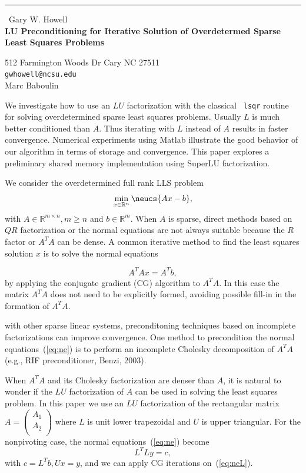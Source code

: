 \documentclass{report}
\begin{document}
\begin{center}
\rule{6in}{1pt} \
{\large Gary W. Howell \\
{\bf LU Preconditioning for Iterative Solution of Overdetermed Sparse Least Squares Problems }}

512 Farmington Woods Dr Cary NC 27511
\\
{\tt gwhowell@ncsu.edu}\\
Marc Baboulin \end{center}

We investigate how to use an $LU$ factorization with the classical {\tt
lsqr} routine for solving overdetermined sparse least squares problems.
Usually $L$ is much better conditioned than $A$. Thus iterating with $L$
instead of $A$ results in faster convergence.
Numerical experiments using Matlab illustrate the good behavior of our
algorithm in terms of storage and convergence.
This paper explores a preliminary shared memory implementation using
SuperLU factorization.


We consider the overdetermined full rank LLS problem
\begin{equation}
\label{eq:llsp}
\min_{x \in \mathbb{R}^n} \neucs{Ax - b},
\end{equation}
with $A \in \mathbb{R}^{m \times n}, m \geq n$ and $b \in \mathbb{R}^m$.
When $A$ is sparse, direct methods based on $QR$ factorization or the
normal equations are not always suitable because the $R$ factor or $A^TA$
can be dense.
A common iterative method to find the least squares solution $x$
is to solve the normal equations

\begin{equation}
\label{eq:ne}
A^TAx = A^Tb,
\end{equation}
by applying the conjugate gradient (CG) algorithm to $A^TA$. In this case the matrix
$A^T A$ does not need to be explicitly formed, avoiding possible fill-in
in the formation of $A^TA$.

with other sparse linear systems, preconditoning techniques based on
incomplete factorizations can improve convergence. One method to
precondition the normal equations~(\ref{eq:ne}) is to perform an
incomplete Cholesky decomposition of $A^T A$ (e.g., RIF preconditioner,
Benzi, 2003).

When $A^TA$ and its Cholesky factorization are denser than $A$, it is
natural to wonder if the $LU$ factorization of $A$ can be used in solving
the least squares problem. In this paper we use an $LU$ factorization of
the rectangular matrix $A=\left(
\begin{array}{c}
A_1\\
A_2\\
\end{array}
\right)
$ where $L$ is unit lower trapezoidal and $U$ is upper triangular.
For the nonpivoting case, the normal equations~(\ref{eq:ne}) become
\begin{equation}
\label{eq:neL}
L^TLy=c,
\end{equation}
with $c = L^T b, U x = y $, and we can apply CG iterations on~(\ref{eq:neL}).
\end{document}
